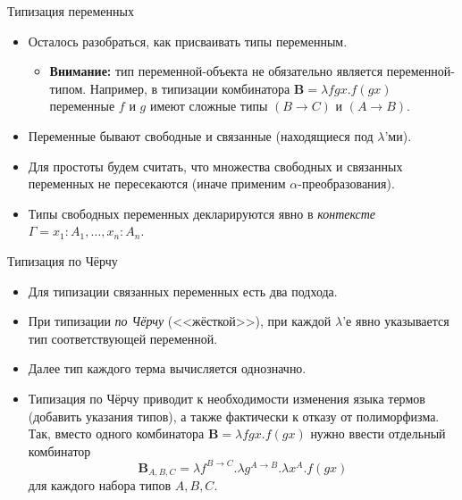 \documentclass[xcolor=dvipsnames]{beamer}
\newcommand{\Bx}{\mathbf{B}}
\begin{document}
\begin{frame}{Типизация переменных}
 
 \begin{itemize}[<+->]
  \item Осталось разобраться, как присваивать типы переменным.
  \begin{itemize}
  \item {\bf Внимание:} тип переменной-объекта не обязательно является переменной-типом. Например, в типизации комбинатора $\Bx = 
  \lambda f g x . f(gx)$ переменные $f$ и $g$ имеют сложные типы $(B \to C)$ и $(A \to B)$.
  \end{itemize}
  \item Переменные бывают свободные и связанные (находящиеся под $\lambda$'ми).
  \item Для простоты будем считать, что множества свободных и связанных переменных не пересекаются (иначе применим $\alpha$-преобразования).
  \item Типы свободных переменных декларируются явно в {\em контексте} $\Gamma = x_1 : A_1, \ldots, x_n : A_n$.
 \end{itemize}

\end{frame}

\begin{frame}{Типизация по Чёрчу}
 
 \begin{itemize}[<+->]
  \item Для типизации связанных переменных есть два подхода.
  \item При типизации {\em по Чёрчу} (<<жёсткой>>), при каждой $\lambda$'е явно указывается тип соответствующей переменной.
  \item Далее тип каждого терма вычисляется однозначно.
  \item Типизация по Чёрчу приводит к необходимости изменения языка термов (добавить указания типов), а также фактически к отказу от полиморфизма. Так, вместо одного комбинатора $\Bx = \lambda fgx. f(gx)$ нужно ввести отдельный комбинатор
  \[
   \Bx_{A,B,C} = \lambda f^{B\to C} . \lambda g^{A \to B}. \lambda x^A. f(gx)
  \]
  для каждого набора типов $A,B,C$.

 \end{itemize}

\end{frame}
\end{document}
